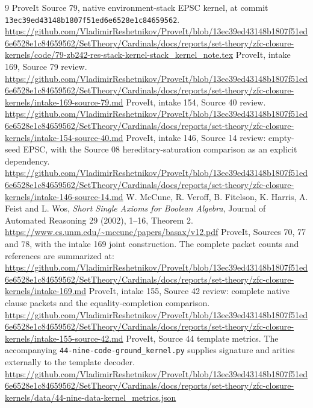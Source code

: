 \documentclass[11pt]{article}
\begin{document}
\begin{thebibliography}{9}
 ProveIt Source 79, native environment-stack EPSC kernel,
at commit \texttt{13ec39ed43148b1807f51ed6e6528e1c84659562}.
\url{https://github.com/VladimirReshetnikov/ProveIt/blob/13ec39ed43148b1807f51ed6e6528e1c84659562/SetTheory/Cardinals/docs/reports/set-theory/zfc-closure-kernels/code/79-zb242-res-stack-kernel-stack_kernel_note.tex}
 ProveIt, intake 169, Source 79 review.
\url{https://github.com/VladimirReshetnikov/ProveIt/blob/13ec39ed43148b1807f51ed6e6528e1c84659562/SetTheory/Cardinals/docs/reports/set-theory/zfc-closure-kernels/intake-169-source-79.md}
 ProveIt, intake 154, Source 40 review.
\url{https://github.com/VladimirReshetnikov/ProveIt/blob/13ec39ed43148b1807f51ed6e6528e1c84659562/SetTheory/Cardinals/docs/reports/set-theory/zfc-closure-kernels/intake-154-source-40.md}
 ProveIt, intake 146, Source 14 review: empty-seed EPSC,
with the Source 08 hereditary-saturation comparison as an explicit dependency.
\url{https://github.com/VladimirReshetnikov/ProveIt/blob/13ec39ed43148b1807f51ed6e6528e1c84659562/SetTheory/Cardinals/docs/reports/set-theory/zfc-closure-kernels/intake-146-source-14.md}
 W. McCune, R. Veroff, B. Fitelson, K. Harris, A. Feist and L. Wos,
\emph{Short Single Axioms for Boolean Algebra}, Journal of Automated Reasoning
29 (2002), 1--16, Theorem 2.
\url{https://www.cs.unm.edu/~mccune/papers/basax/v12.pdf}
 ProveIt, Sources 70, 77 and 78, with the intake 169 joint
construction. The complete packet counts and references are summarized at:
\url{https://github.com/VladimirReshetnikov/ProveIt/blob/13ec39ed43148b1807f51ed6e6528e1c84659562/SetTheory/Cardinals/docs/reports/set-theory/zfc-closure-kernels/intake-169.md}
 ProveIt, intake 155, Source 42 review: complete native
clause packets and the equality-completion comparison.
\url{https://github.com/VladimirReshetnikov/ProveIt/blob/13ec39ed43148b1807f51ed6e6528e1c84659562/SetTheory/Cardinals/docs/reports/set-theory/zfc-closure-kernels/intake-155-source-42.md}
 ProveIt, Source 44 template metrics. The accompanying
\texttt{44-nine-code-ground\_kernel.py} supplies signature and arities
externally to the template decoder.
\url{https://github.com/VladimirReshetnikov/ProveIt/blob/13ec39ed43148b1807f51ed6e6528e1c84659562/SetTheory/Cardinals/docs/reports/set-theory/zfc-closure-kernels/data/44-nine-data-kernel_metrics.json}
\end{thebibliography}
\end{document}
